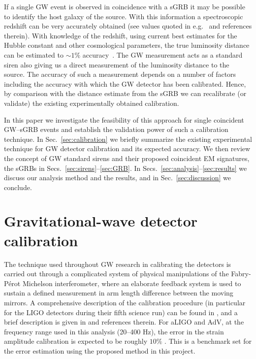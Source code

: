 \documentclass[prd, twocolumn, lengthcheck, superscriptaddress, showpacs, letterpaper, nofootinbib]{revtex4-1}
\begin{document}
If a single \ac{GW} event is observed in coincidence with a \ac{sGRB} it may be
possible to identify the host galaxy of the source.  With this information a
spectroscopic redshift can be very accurately obtained (see values quoted in
e.g.\ \cite{0004-637X-664-2-1000} and references therein). With knowledge of
the redshift, using current best estimates for the Hubble constant and other
cosmological parameters, the true luminosity distance can be estimated to $\sim
1\%$ accuracy~\cite{2015arXiv150201589P}.  The \ac{GW} measurement
acts as a standard siren also giving us a direct measurement of the luminosity
distance to the source. The accuracy of such a measurement depends on a number
of factors including the accuracy with which the \ac{GW} detector has been
calibrated.  Hence, by comparison with the distance estimate from the \ac{sGRB}
we can recalibrate (or validate) the existing experimentally obtained
calibration. 

In this paper we investigate the feasibility of this approach for single coincident 
\ac{GW}--\ac{sGRB} events and establish the validation power of such a calibration technique.  In 
Sec.~\ref{sec:calibration} we briefly summarize the existing experimental technique for \ac{GW} 
detector calibration and its expected accuracy.  We then review the concept of \ac{GW} standard 
sirens and their proposed coincident \ac{EM} signatures, the \acp{sGRB} in
Secs.~\ref{sec:sirens}--\ref{sec:GRB}. In Secs.~\ref{sec:analysis}--\ref{sec:results} we 
discuss our analysis method and the results, and in Sec.~\ref{sec:discussion} we 
conclude.    

\section{Gravitational-wave detector calibration\label{sec:calibration}}

The technique used throughout \ac{GW} research in calibrating the detectors is
carried out through a complicated system of physical manipulations of the
Fabry-P\'{e}rot Michelson interferometer, where an elaborate feedback
system is used to sustain a defined measurement in arm length difference
between the moving mirrors. A comprehensive description of the calibration
procedure (in particular for the LIGO detectors during their fifth science run)
can be found in \cite{2010NIMPA.624..223A}, and a brief description is given in
\cite{Vitale:2012} and references therein. For \ac{aLIGO} and \ac{AdV}, at the
frequency range used in this analysis (20--400 Hz), the error in the
strain amplitude calibration is expected to be roughly $10\%$
\cite{Vitale:2012}. This is a benchmark set for the error estimation using the
proposed method in this project.
\end{document}
